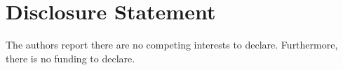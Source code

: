 \documentclass[a4paper,reqno]{amsart}
\numberwithin{equation}{section}
\numberwithin{figure}{section}
\begin{document}
\section*{Disclosure Statement}
The authors report there are no competing interests to declare. Furthermore, there is no funding to declare.
















\printbibliography
\end{document}
